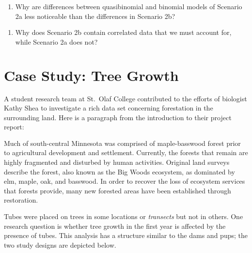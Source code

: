 \documentclass[
]{krantz}
\providecommand{\tightlist}{%
  \setlength{\itemsep}{0pt}\setlength{\parskip}{0pt}}
\renewenvironment{quote}{\begin{VF}}{\end{VF}}
\begin{document}
\begin{quote}
\begin{enumerate}
\def\labelenumi{\arabic{enumi}.}
\setcounter{enumi}{9}
\tightlist
\item
  Why are differences between quasibinomial and binomial models of Scenario 2a less noticeable than the differences in Scenario 2b?
\end{enumerate}
\end{quote}

\begin{quote}
\begin{enumerate}
\def\labelenumi{\arabic{enumi}.}
\setcounter{enumi}{10}
\tightlist
\item
  Why does Scenario 2b contain correlated data that we must account for, while Scenario 2a does not?
\end{enumerate}
\end{quote}

\hypertarget{case-study-tree-growth}{%
\section{Case Study: Tree Growth}\label{case-study-tree-growth}}

A student research team at St.~Olaf College contributed to the efforts of biologist Kathy Shea to investigate a rich data set concerning forestation in the surrounding land. \citep{Eisinger2011} Here is a paragraph from the introduction to their project report:

\begin{quote}
Much of south-central Minnesota was comprised of maple-basswood forest prior to agricultural development and settlement. Currently, the forests that remain are highly fragmented and disturbed by human activities. Original land surveys describe the forest, also known as the Big Woods ecosystem, as dominated by elm, maple, oak, and basswood. In order to recover the loss of ecosystem services that forests provide, many new forested areas have been established through restoration.
\end{quote}

Tubes were placed on trees in some locations or \emph{transects} but not in others. One research question is whether tree growth in the first year is affected by the presence of tubes. This analysis has a structure similar to the dams and pups; the two study designs are depicted below.
\end{document}
